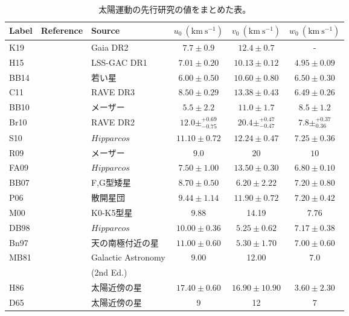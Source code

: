 \begin{table}
\begin{center}
\footnotesize
\begin{tabular}{l|l|l|c|c|c} \hline
 \rowcolor{LightCyan}
 Label & Reference & Source & $u_0 \ (\mathrm{km\ s^{-1}})$ & $v_0 \ (\mathrm{km\ s^{-1}})$ & $w_0 \ (\mathrm{km\ s^{-1}})$\\
  \hline
  K19 & \cite{Kawata2019} & Gaia DR2 & $7.7\pm0.9$ & $12.4\pm0.7$ & -\\ 
  \hline
  H15 & \cite{Huang2015} & LSS-GAC DR1 & $7.01\pm0.20$ & $10.13\pm0.12$ & $4.95\pm0.09$\\ 
  \hline
  BB14 & \cite{Bobylev2014} & 若い星 & $6.00\pm0.50$ & $10.60\pm0.80$ & $6.50\pm0.30$\\ 
  \hline
  C11 & \cite{Coskunoglu2011} & RAVE DR3 & $8.50\pm0.29$ & $13.38\pm0.43$ & $6.49\pm0.26$\\ 
  \hline
  BB10 & \cite{Bobylev2010} & メーザー & $5.5\pm2.2$ & $11.0\pm1.7$ & $8.5\pm1.2$\\ 
  \hline
  Br10 & \cite{Breddels2010} & RAVE DR2 & $12.0\pm ^{+0.69} _{-0.75}$ & $20.4\pm^{+0.47} _{-0.47}$ & $7.8\pm^{+0.37} _{0.36}$\\ 
  \hline
  S10 & \cite{Schonrich2010} & $Hipparcos$ & $11.10\pm0.72$ & $12.24\pm0.47$ & $7.25\pm0.36$\\ 
  \hline
  R09 & \cite{Reid2009} & メーザー & $9.0$ & $20$ & $10$\\ 
  \hline
  FA09 & \cite{Francis2009} & $Hipparcos$ & $7.50\pm1.00$ & $13.50\pm0.30$ & $6.80\pm0.10$\\ 
  \hline
  BB07 & \cite{Bobylev2007} & F,G型矮星 & $8.70\pm0.50$ & $6.20\pm2.22$ & $7.20\pm0.80$\\ 
  \hline
  P06 & \cite{Piskunov2006} & 散開星団 & $9.44\pm1.14$ & $11.90\pm0.72$ & $7.20\pm0.42$\\ 
  \hline
  M00 & \cite{Mignard2000} & K0-K5型星 & 9.88 & 14.19 & 7.76\\ 
  \hline
  DB98 & \cite{DB1998} & $Hipparcos$ & $10.00\pm0.36$ & $5.25\pm0.62$ & $7.17\pm0.38$\\
  \hline
  Bn97 & \cite{Binney1997} & 天の南極付近の星 & $11.00\pm0.60$ & $5.30\pm1.70$ & $7.00\pm0.60$\\
  \hline
  \multirow{2}{*}{MB81} & \multirow{2}{*}{\cite{MB1981}} & Galactic Astronomy & \multirow{2}{*}{9.00} & \multirow{2}{*}{12.00} & \multirow{2}{*}{7.0} \\
  && (2nd Ed.) &&& \tabularnewline[\doublerulesep]
  \hline
  H86 & \cite{Homann1886} & 太陽近傍の星 & $17.40\pm0.60$ & $16.90\pm10.90$ & $3.60\pm2.30$\\
  \hline
  D65 & \cite{Delhaye1965} & 太陽近傍の星 & 9 & 12 & 7 \\
  \hline
\end{tabular}
\caption{太陽運動の先行研究の値をまとめた表。}
\label{table3}
\end{center}
\end{table}

